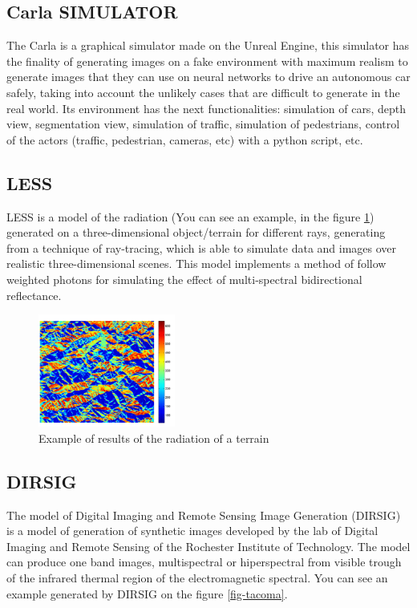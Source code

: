 \documentclass[10pt,a4paper,twocolumn,twoside]{article}
\begin{document}
\subsection{Carla SIMULATOR}

The Carla is a graphical simulator made on the Unreal Engine, this simulator has the finality of generating images on a fake environment with maximum realism to generate images that they can use on neural networks to drive an autonomous car safely, taking into account the unlikely cases that are difficult to generate in the real world. Its environment has the next functionalities: simulation of cars, depth view, segmentation view, simulation of traffic,  simulation of pedestrians, control of the actors (traffic, pedestrian, cameras, etc) with a python script, etc.

\subsection{LESS}
LESS is a model of the radiation (You can see an example, in the figure \ref{fig-lessradiacio}) generated on a three-dimensional object/terrain for different rays, generating from a technique of ray-tracing, which is able to simulate data and images over realistic three-dimensional scenes. This model implements a method of follow weighted photons for simulating the effect of multi-spectral bidirectional reflectance.

\begin{figure}[!h]
\centering
  	\includegraphics[width=0.4\textwidth]{lessradiacio}
	\caption{Example of results of the radiation of a terrain}
	\label{fig-lessradiacio}
\end{figure}

\subsection{DIRSIG}
The model of Digital Imaging and Remote Sensing Image Generation (DIRSIG) is a model of generation of synthetic images developed by the lab of Digital Imaging and Remote Sensing of the Rochester Institute of Technology. The model can produce one band images, multispectral or hiperspectral from visible trough of the infrared thermal region of the electromagnetic spectral. You can see an example generated by DIRSIG on the figure \ref{fig-tacoma}.
\end{document}
